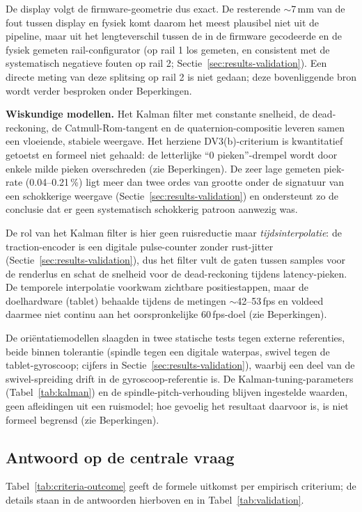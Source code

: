 \documentclass[10pt, a4paper, twocolumn]{article}
\begin{document}
De display volgt de firmware-geometrie dus exact. De resterende $\sim$7\,mm van de
fout tussen display en fysiek komt daarom het meest plausibel niet uit de
pipeline, maar uit het lengteverschil tussen de in de firmware gecodeerde en de
fysiek gemeten rail-configurator (op rail 1 los gemeten, en consistent met de
systematisch negatieve fouten op rail 2; Sectie~\ref{sec:results-validation}). Een
directe meting van deze splitsing op rail 2 is niet gedaan; deze bovenliggende
bron wordt verder besproken onder Beperkingen.

\textbf{Wiskundige modellen.}
Het Kalman filter met constante snelheid, de dead-reckoning, de
Catmull-Rom-tangent en de quaternion-compositie leveren samen een vloeiende,
stabiele weergave. Het herziene DV3(b)-criterium is kwantitatief getoetst en formeel niet gehaald:
de letterlijke ``0 pieken''-drempel wordt door enkele milde pieken overschreden
(zie Beperkingen). De zeer lage gemeten piek-rate (0.04--0.21\,\%) ligt meer dan
twee ordes van grootte onder de signatuur van een schokkerige weergave
(Sectie~\ref{sec:results-validation}) en ondersteunt zo de conclusie dat er geen
systematisch schokkerig patroon aanwezig was.

De rol van het Kalman filter is hier geen ruisreductie maar
\emph{tijdsinterpolatie}: de traction-encoder is een digitale pulse-counter zonder
rust-jitter (Sectie~\ref{sec:results-validation}), dus het filter vult de gaten
tussen samples voor de renderlus en schat de snelheid voor de dead-reckoning
tijdens latency-pieken. De temporele interpolatie voorkwam zichtbare
positiestappen, maar de doelhardware (tablet) behaalde tijdens de metingen
$\sim$42--53\,fps en voldeed daarmee niet continu aan het oorspronkelijke
60\,fps-doel (zie Beperkingen).

De oriëntatiemodellen slaagden in twee statische tests tegen externe referenties,
beide binnen tolerantie (spindle tegen een digitale waterpas, swivel tegen de
tablet-gyroscoop; cijfers in Sectie~\ref{sec:results-validation}), waarbij een deel
van de swivel-spreiding drift in de gyroscoop-referentie is. De
Kalman-tuning-parameters (Tabel~\ref{tab:kalman}) en de spindle-pitch-verhouding
blijven ingestelde waarden, geen afleidingen uit een ruismodel; hoe gevoelig het
resultaat daarvoor is, is niet formeel begrensd (zie Beperkingen).

\subsection{Antwoord op de centrale vraag}
Tabel~\ref{tab:criteria-outcome} geeft de formele uitkomst per empirisch
criterium; de details staan in de antwoorden hierboven en in
Tabel~\ref{tab:validation}.
\end{document}
